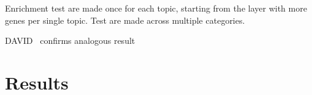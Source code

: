 Enrichment test are made once for each topic, starting from the layer with more genes per 
single topic. Test are made across multiple categories.

DAVID~\cite{huang2008bioinformatics,huang2009systematic} confirms analogous result

\section{Results}
